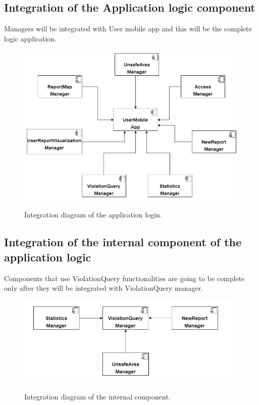 \documentclass[../RASD.tex]{subfiles}
\begin{document}
    \subsection{Integration of the Application logic component}\label{subsec:integration-of-the-application-logic-component}
    Managers will be integrated with User mobile app and this will be the complete logic application.
    \begin{figure}[H]
        \centering
        \includegraphics[scale = 0.8]{assets/integration_diagrams/user_mobile_app_integration.png}\\[1.6 cm]
        \caption[\textit{Integration} Diagram of the application logic]{Integration diagram of the application login.}
    \end{figure}
    \subsection{Integration of the internal component of the application logic}\label{subsec:integration-of-the-internal-component-of-the-application-logic}
    Components that use ViolationQuery functionalities are going to be complete only after they will be integrated with ViolationQuery manager.
    \begin{figure}[H]
        \centering
        \includegraphics[scale = 0.8]{assets/integration_diagrams/violation_query_integration.png}\\[1.6 cm]
        \caption[\textit{Integration} Diagram of the internal component]{Integration diagram of the internal component.}
    \end{figure}
\end{document}
